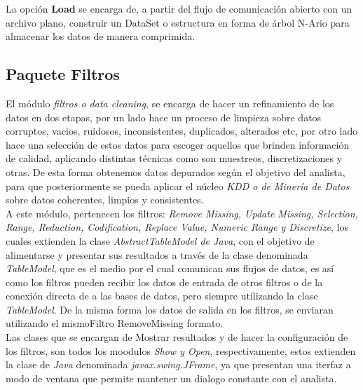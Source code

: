 \newpage

La opci\'on \textbf{Load} se encarga de, a partir del flujo de comunicaci\'on abierto con un archivo plano, 
construir un DataSet o estructura en forma de \'arbol N-Ario para almacenar los datos de manera comprimida.

\subsection{Paquete Filtros}

El m\'odulo \textit{filtros o data cleaning}, se encarga de hacer un refinamiento de los datos en  dos etapas, por un lado hace un proceso de limpieza sobre datos corruptos, vacios, ruidosos, inconsistentes, duplicados, alterados etc, por otro lado hace una selecci\'on de estos datos para escoger aquellos que brinden informaci\'on de calidad, aplicando distintas t\'ecnicas como son muestreos, discretizaciones y otras. De esta forma obtenemos datos depurados seg\'un el objetivo del analista, para que posteriormente se pueda aplicar el n\'ucleo \textit{KDD o de Miner\'ia de Datos} sobre datos coherentes, limpios y consistentes.\\

A este m\'odulo, pertenecen los filtros: \textit{Remove Missing, Update Missing, Selection, Range, Reduction, Codification, Replace Value, Numeric Range y Discretize}, los cuales extienden la clase  \textit{AbstractTableModel de Java}, con el objetivo de alimentarse y presentar sus resultados a trav\'es de la clase denominada \textit{TableModel}, que es el medio por el cual comunican sus flujos de datos, es as\'i como los filtros pueden recibir los datos de entrada de otros filtros o de la conexi\'on directa de a las bases de datos, pero siempre utilizando la clase \textit{TableModel}. De la misma forma los datos de salida en los filtros, se enviaran utilizando el mismoFiltro RemoveMissing formato.\\

Las clases que se encargan de Mostrar resultados y de hacer la configuraci\'on de los filtros, son todos los moodulos \textit{Show y Open}, respectivamente, estos extienden la clase de \textit{Java} denominada \textit{javax.swing.JFrame}, ya que presentan una iterfaz a modo de ventana que permite mantener un dialogo constante con el analista.\\ 

